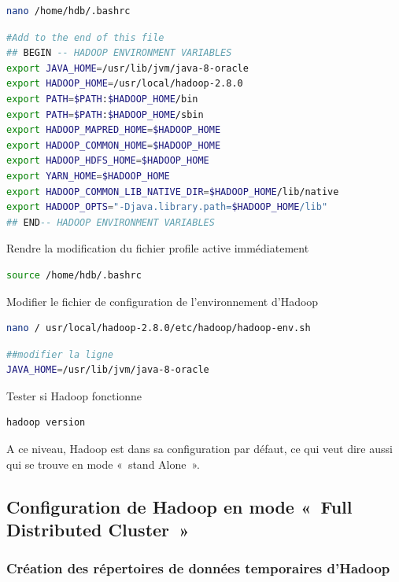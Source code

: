 \documentclass[12pt,french]{book}
\begin{document}
\begin{lstlisting}[language=bash, frame=single]
nano /home/hdb/.bashrc
\end{lstlisting}

\begin{lstlisting}[language=bash, frame=single]
#Add to the end of this file 
## BEGIN -- HADOOP ENVIRONMENT VARIABLES
export JAVA_HOME=/usr/lib/jvm/java-8-oracle
export HADOOP_HOME=/usr/local/hadoop-2.8.0
export PATH=$PATH:$HADOOP_HOME/bin
export PATH=$PATH:$HADOOP_HOME/sbin
export HADOOP_MAPRED_HOME=$HADOOP_HOME
export HADOOP_COMMON_HOME=$HADOOP_HOME
export HADOOP_HDFS_HOME=$HADOOP_HOME
export YARN_HOME=$HADOOP_HOME
export HADOOP_COMMON_LIB_NATIVE_DIR=$HADOOP_HOME/lib/native
export HADOOP_OPTS="-Djava.library.path=$HADOOP_HOME/lib"
## END-- HADOOP ENVIRONMENT VARIABLES
\end{lstlisting}

Rendre la modification du fichier profile active immédiatement

\begin{lstlisting}[language=bash, frame=single]
source /home/hdb/.bashrc
\end{lstlisting}

Modifier le fichier de configuration de l’environnement d’Hadoop 

\begin{lstlisting}[language=bash, frame=single]
nano / usr/local/hadoop-2.8.0/etc/hadoop/hadoop-env.sh
\end{lstlisting}

\begin{lstlisting}[language=bash, frame=single]
##modifier la ligne 
JAVA_HOME=/usr/lib/jvm/java-8-oracle
\end{lstlisting}

Tester si Hadoop fonctionne

\begin{lstlisting}[language=bash, frame=single]
hadoop version
\end{lstlisting}

A ce niveau, Hadoop est dans sa configuration par défaut, ce qui veut dire aussi qui se trouve en mode « stand Alone ».

\subsection{Configuration de Hadoop en mode « Full Distributed Cluster »}

\subsubsection{Création des répertoires de données temporaires d’Hadoop}
\end{document}
